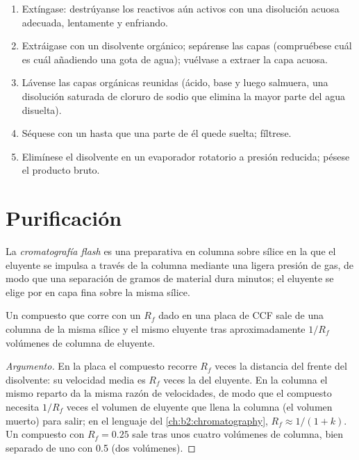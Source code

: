 \begin{method}\label{met:b2:lab-techniques-2:work-up}
\begin{enumerate}
  \item Extíngase: destrúyanse los reactivos aún activos con una disolución acuosa adecuada, lentamente y
        enfriando.
  \item Extráigase con un disolvente orgánico; sepárense las capas (compruébese cuál es cuál añadiendo una gota de
        agua); vuélvase a extraer la capa acuosa.
  \item Lávense las capas orgánicas reunidas (ácido, base y luego salmuera, una disolución saturada de cloruro de sodio
        que elimina la mayor parte del agua disuelta).
  \item Séquese con un  hasta que una parte de él quede suelta; fíltrese.
  \item Elimínese el disolvente en un evaporador rotatorio a presión reducida; pésese el producto bruto.
\end{enumerate}
\end{method}

\section{Purificación}

\begin{definition}\label{def:b2:lab-techniques-2:flash}
La \emph{cromatografía flash} es una  preparativa en columna sobre sílice en
la que el eluyente se impulsa a través de la columna mediante una ligera presión de gas, de modo que una separación de gramos
de material dura minutos; el eluyente se elige por  en capa fina sobre la misma sílice.
\end{definition}

\begin{proposition}\label{prop:b2:lab-techniques-2:column-volumes}
Un compuesto que corre con un $R_f$ dado en una placa de CCF sale de una columna de la misma sílice y el mismo eluyente tras
aproximadamente $1/R_f$ volúmenes de columna de eluyente.
\end{proposition}

\begin{proof}[Argumento]
En la placa el compuesto recorre $R_f$ veces la distancia del frente del disolvente: su velocidad media es $R_f$
veces la del eluyente. En la columna el mismo reparto da la misma razón de velocidades, de modo que el
compuesto necesita $1/R_f$ veces el volumen de eluyente que llena la columna (el volumen muerto) para
salir; en el lenguaje del \cref{ch:b2:chromatography}, $R_f \approx 1/(1 + k)$. Un compuesto con $R_f = 0.25$
sale tras unos cuatro volúmenes de columna, bien separado de uno con 0.5 (dos volúmenes).
\end{proof}

